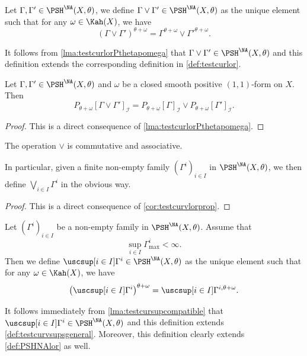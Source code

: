 \begin{definition}\label{def:PSHNAlor}
    Let $\Gamma,\Gamma'\in \PSH^{\NA}(X,\theta)$, we define $\Gamma\lor \Gamma'\in \PSH^{\NA}(X,\theta)$ as the unique element such that for any $\omega\in \Kah(X)$, we have
    \[
    \left( \Gamma\lor \Gamma' \right)^{\theta+\omega}=\Gamma^{\theta+\omega}\lor \Gamma'^{\theta+\omega}.
    \]
\end{definition}
It follows from \cref{lma:testcurlorPthetapomega} that $\Gamma\lor \Gamma'\in \PSH^{\NA}(X,\theta)$ and this definition extends the corresponding definition in \cref{def:testcurlor}.

\begin{proposition}\label{prop:NApotential:L394}
    Let $\Gamma,\Gamma'\in \PSH^{\NA}(X,\theta)$ and $\omega$ be a closed smooth positive $(1,1)$-form on $X$. Then
    \[
    P_{\theta+\omega}[\Gamma\lor \Gamma']_{\mathcal{I}}=P_{\theta+\omega}[\Gamma]_{\mathcal{I}}\lor P_{\theta+\omega}[\Gamma']_{\mathcal{I}}.
    \]
\end{proposition}
\begin{proof}
    This is a direct consequence of \cref{lma:testcurlorPthetapomega}.
\end{proof}

\begin{proposition}\label{prop:NApotential:L404}
    The operation $\lor$ is commutative and associative.
\end{proposition}
In particular, given a finite non-empty family $(\Gamma^i)_{i\in I}$ in $\PSH^{\NA}(X,\theta)$, we then define $\bigvee_{i\in I}\Gamma^i$ in the obvious way.
\begin{proof}
    This is a direct consequence of \cref{cor:testcurvlorprop}.
\end{proof}


\begin{definition}\label{def:NApotential:L413}
    Let $(\Gamma^i)_{i\in I}$ be a non-empty family in $\PSH^{\NA}(X,\theta)$. Assume that
    \begin{equation}\label{eq:supPSHNAmaxfinite}
        \sup_{i\in I}\Gamma^i_{\max}<\infty.
    \end{equation}
    Then we define $\uscsup[i\in I]\Gamma^i\in \PSH^{\NA}(X,\theta)$ as the unique element such that for any $\omega\in \Kah(X)$, we have
    \[
        \left( \uscsup[i\in I]\Gamma^i \right)^{\theta+\omega}=\uscsup[i\in I]\Gamma^{i,\theta+\omega}.
    \]
\end{definition}
It follows immediately from \cref{lma:testcursupcompatible} that $\uscsup[i\in I]\Gamma^i\in \PSH^{\NA}(X,\theta)$ and this definition extends \cref{def:testcurvsupsgeneral}.
Moreover, this definition clearly extends \cref{def:PSHNAlor} as well.


